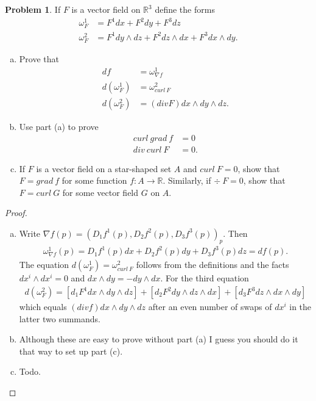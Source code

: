 \documentclass[20pt]{article}
\theoremstyle{plain}
\theoremstyle{definition}
\newtheorem*{problem}{Problem}
\newcommand{\reals}{\mathbb{R}}
\begin{document}
\begin{problem}{4.19}
  If $F$ is a vector field on $\reals^3$ define the forms
  \begin{align*}
    \omega^1_F &= F^1 dx + F^2 dy + F^3 dz \\
    \omega^2_F &= F^1 dy \wedge dz + F^2 dz \wedge dx + F^3 dx \wedge dy.
  \end{align*}
  \begin{enumerate}[(a)]
    \item Prove that
    \begin{align*}
      df &= \omega^1_{\nabla f}\\
      d(\omega^1_F) &= \omega^2_{curl\ F} \\
      d(\omega^2_F) &= (div F)dx \wedge dy \wedge dz.
    \end{align*}
    \item
    Use part (a) to prove
    \begin{align*}
      curl \ grad\ f &= 0 \\
      div \ curl \ F &= 0.
    \end{align*}
    \item
    If $F$ is a vector field on a star-shaped set $A$ and $curl\ F = 0$, show that
    $F = grad\ f$ for some function $f: A \to \reals$.  Similarly, if $\div\ F = 0$,
    show that $F = curl\ G$ for some vector field $G$ on $A$.
  \end{enumerate}
\end{problem}

\begin{proof}
  \begin{enumerate}[(a)]
  \item
  Write $\nabla f(p) = (D_1f^1(p), D_2f^2(p), D_3f^3(p))_p.$
  Then
  \begin{align*}
    \omega^1_{\nabla f}(p) = D_1f^1(p)dx + D_2f^2(p)dy + D_3f^3(p)dz = df(p).
  \end{align*}
  The equation $d(\omega^1_F) = \omega^2_{curl\ F}$
  follows from the definitions and the facts
  $dx^i \wedge dx^i = 0$ and $dx \wedge dy = -dy \wedge dx$.
  For the third equation
  \begin{align*}
    d(\omega^2_F) =
    [d_1F^1 dx \wedge dy \wedge dz] +
    [d_2F^2 dy \wedge dz \wedge dx] +
    [d_3F^3 dz \wedge dx \wedge dy]
  \end{align*}
  which equals $(div f) dx \wedge dy \wedge dz$
  after an even number of swaps of $dx^i$ in the latter two summands.
  \item
  {\color{Blue}Although these are easy to prove without part (a) I guess you should do it that way to set
    up part (c).}
	\item {\color{Blue} Todo.}
  \end{enumerate}
\end{proof}
\end{document}
